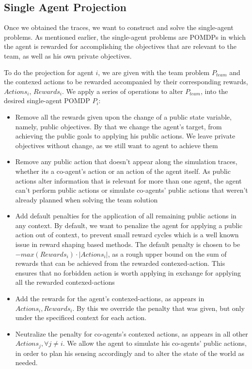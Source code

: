 \documentclass[letterpaper]{article} %
\begin{document}
\subsection{Single Agent Projection}
Once we obtained the traces, we want to construct and solve the single-agent problems. As mentioned earlier, the single-agent problems are POMDPs in which the agent is rewarded for accomplishing the objectives that are relevant to the team, as well as his own private objectives.

To do the projection for agent $i$, we are given with the team problem $P_{team}$ and the contexed actions to be rewarded accompanied by their corresponding rewards, $Actions_i$, $Rewards_i$.
We apply a series of operations to alter $P_{team}$, into the desired single-agent POMDP $P_i$:
\begin{itemize}
\item{Remove all the rewards given upon the change of a public state variable, namely, public objectives. By that we change the agent's target, from achieving the public goals to applying his public actions. We leave private objectives without change, as we still want to agent to achieve them}
\item{Remove any public action that doesn't appear along the simulation traces, whether its a co-agent's action or an action of the agent itself. As public actions alter information that is relevant for more than one agent, the agent can't perform public actions or simulate co-agents' public actions that weren't already planned when solving the team solution}
\item{Add default penalties for the application of all remaining public actions in any context. By default, we want to penalize the agent for applying a public action out of context, to prevent small reward cycles which is a well known issue in reward shaping based methods. The default penalty is chosen to be $-max(Rewards_i)\cdot|Actions_i|$, as a rough upper bound on the sum of rewards that can be achieved from the rewarded contexed-action. This ensures that no forbidden action is worth applying in exchange for applying all the rewarded contexed-actions}
\item{Add the rewards for the agent's contexed-actions, as appears in $Actions_i, Rewards_i$. By this we override the penalty that was given, but only under the specificed context for each action.}
\item{Neutralize the penalty for co-agents's contexed actions, as appears in all other $Actions_j, \forall j \neq i$. We allow the agent to simulate his co-agents' public actions, in order to plan his sensing accordingly and to alter the state of the world as needed.}

\end{itemize}
\end{document}
